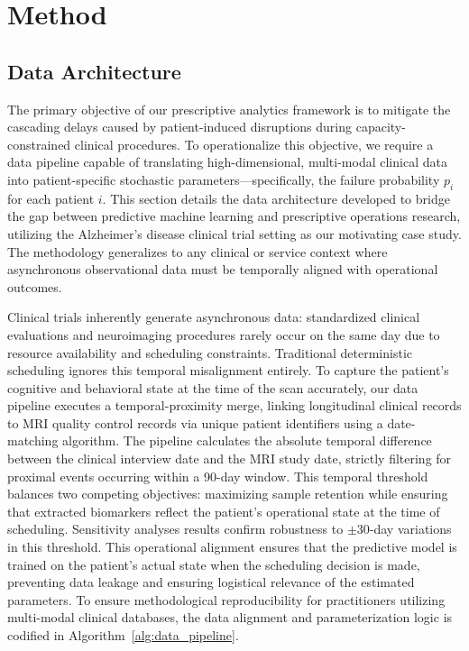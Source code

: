 \documentclass[11pt,a4paper]{article}
\begin{document}
\newpage
\section{Method}

\subsection{Data Architecture}
\label{sec:data_architecture}

The primary objective of our prescriptive analytics framework is to mitigate the cascading delays caused by patient-induced disruptions during capacity-constrained clinical procedures. To operationalize this objective, we require a data pipeline capable of translating high-dimensional, multi-modal clinical data into patient-specific stochastic parameters---specifically, the failure probability $p_i$ for each patient $i$. This section details the data architecture developed to bridge the gap between predictive machine learning and prescriptive operations research, utilizing the Alzheimer's disease clinical trial setting as our motivating case study. The methodology generalizes to any clinical or service context where asynchronous observational data must be temporally aligned with operational outcomes.

Clinical trials inherently generate asynchronous data: standardized clinical evaluations and neuroimaging procedures rarely occur on the same day due to resource availability and scheduling constraints. Traditional deterministic scheduling ignores this temporal misalignment entirely. To capture the patient's cognitive and behavioral state at the time of the scan accurately, our data pipeline executes a temporal-proximity merge, linking longitudinal clinical records to MRI quality control records via unique patient identifiers using a date-matching algorithm. The pipeline calculates the absolute temporal difference between the clinical interview date and the MRI study date, strictly filtering for proximal events occurring within a 90-day window. This temporal threshold balances two competing objectives: maximizing sample retention while ensuring that extracted biomarkers reflect the patient's operational state at the time of scheduling. Sensitivity analyses results confirm robustness to $\pm$30-day variations in this threshold. This operational alignment ensures that the predictive model is trained on the patient's actual state when the scheduling decision is made, preventing data leakage and ensuring logistical relevance of the estimated parameters. To ensure methodological reproducibility for practitioners utilizing multi-modal clinical databases, the data alignment and parameterization logic is codified in Algorithm~\ref{alg:data_pipeline}.
\end{document}

